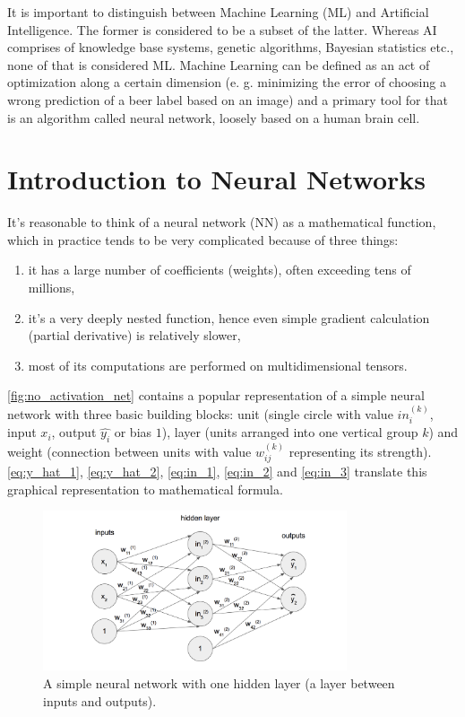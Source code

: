 \documentclass[11pt]{article}
\begin{document}
It is important to distinguish between Machine Learning (ML) and Artificial Intelligence. The former is considered to be a subset of the latter. Whereas AI comprises of knowledge base systems, genetic algorithms, Bayesian statistics etc., none of that is considered ML. Machine Learning can be defined as an act of optimization along a certain dimension (e. g. minimizing the error of choosing a wrong prediction of a beer label based on an image) and a primary tool for that is an algorithm called neural network, loosely based on a human brain cell.
\clearpage

\section{Introduction to Neural Networks} \label{introduction_to_nn}
It's reasonable to think of a neural network (NN) as a mathematical function, which in practice tends to be very complicated because of three things:
\begin{enumerate}[1)]
\item it has a large number of coefficients (weights), often exceeding tens of millions,
\item it's a very deeply nested function, hence even simple gradient calculation (partial derivative) is relatively slower,
\item most of its computations are performed on multidimensional tensors.
\end{enumerate}
\autoref{fig:no_activation_net} contains a popular representation of a simple neural network with three basic building blocks: unit (single circle with value $in_i^{(k)}$, input $x_i$, output $\hat{y_i}$ or bias $1$), layer (units arranged into one vertical group $k$) and weight (connection between units with value $w_{ij}^{(k)}$ representing its strength). \autoref{eq:y_hat_1}, \ref{eq:y_hat_2}, \ref{eq:in_1}, \ref{eq:in_2} and \ref{eq:in_3} translate this graphical representation to mathematical formula.\\

\begin{figure}[h]
\includegraphics[width=0.8\textwidth]{no_activation_net}
\centering
\caption{A simple neural network with one hidden layer (a layer between inputs and outputs).}
\label{fig:no_activation_net}
\end{figure}
\end{document}

